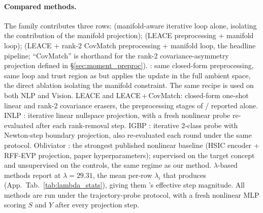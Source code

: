 \paragraph{Compared methods.} The \TanGCE{} family contributes three rows: \TanGCE{} (manifold-aware iterative loop alone, isolating the contribution of the manifold projection); \TanGCEp{} (LEACE preprocessing + manifold loop); \TanGCEpp{} (LEACE + rank-2 CovMatch preprocessing + manifold loop, the headline pipeline; ``CovMatch'' is shorthand for the rank-2 covariance-asymmetry projection defined in §\ref{sec:moment_preproc}). \AmbGCEpp{}: same closed-form preprocessing, same loop and trust region as \TanGCEpp{} but applies the update in the full ambient space, the direct ablation isolating the manifold constraint. The same recipe is used on both NLP and Vision. LEACE \citep{belrose-etal-2023-leace} and LEACE\,+\,CovMatch: closed-form one-shot linear and rank-2 covariance erasers, the preprocessing stages of \TanGCEp{} / \TanGCEpp{} reported alone. INLP \citep{ravfogel-etal-2020-null}: iterative linear nullspace projection, with a fresh nonlinear probe re-evaluated after each rank-removal step. IGBP \citep{iskander-etal-2023-shielded}: iterative 2-class probe with Newton-step boundary projection, also re-evaluated each round under the same protocol. Obliviator \citep{akbari-etal-2025-obliviator}: the strongest published nonlinear baseline (HSIC encoder + RFF-EVP projection, paper hyperparameters); supervised on the target concept and unsupervised on the controls, the same regime as our method. $\lambda$-based methods report at $\lambda = 29.31$, the mean per-row $\lambda_i$ that \TanGCEpp{} produces (App.~Tab.~\ref{tab:lambda_stats}), giving them \TanGCEpp{}'s effective step magnitude. All methods are run under the trajectory-probe protocol, with a fresh nonlinear MLP scoring $S$ and $Y$ after every projection step.

